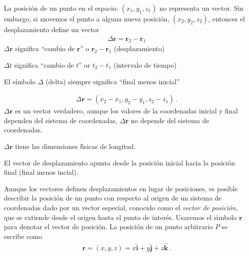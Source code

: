 La posici\'on de un punto en el espacio: $(x_1,y_1,z_1)$ no representa un vector. Sin embargo, si movemos el punto a alguna nueva posici\'on, $(x_2,y_2,z_2)$, entonces el desplazamiento define un vector 
\begin{align}
  \Delta \mathbf{r}=\mathbf{r}_2-\mathbf{r}_1
\end{align}
$\Delta\mathbf{r}$ significa ``cambio de $\mathbf{r}$'' o $\mathbf{r}_2-\mathbf{r}_1$ (desplazamiento)

$\Delta t$ significa ``cambio de $t$'' or $t_2-t_1$ (intervalo de tiempo)

El símbolo $\Delta$ (delta) siempre significa ``final menos inicial''

\begin{align}
  \Delta\mathbf{r}=(x_2-x_1,y_2-y_1,z_2-z_1)\,.
\end{align}
$\Delta\mathbf{r}$ es un vector verdadero, aunque los valores de la coordenadas inicial y final dependen del sistema de coordenadas, $\Delta\mathbf{r}$ no depende del sistema de coordenadas. 

$\Delta\mathbf{r}$ tiene las dimensiones f\'\i sicas de longitud. 


El vector de desplazamiento apunta desde la posición inicial hacia la posición final (final menos incial).


Aunque los vectores definen desplazamientos en lugar de posiciones, es posible describir la posici\'on de un punto con respecto al origen de un sistema de coordenadas dado por un vector especial, conocido como el \emph{vector de posici\'on}, que se extiende desde el origen hasta el punto de inter\'es. Usaremos el s\'\i mbolo $\mathbf{r}$ para denotar el vector de posici\'on. La posici\'on de un punto arbitrario $P$ se escribe como
\begin{align}
  \mathbf{r}=(x,y,z)=x\hat{\mathbf{i}}+
  y\hat{\mathbf{j}}+z\hat{\mathbf{k}}\,.
\end{align}

